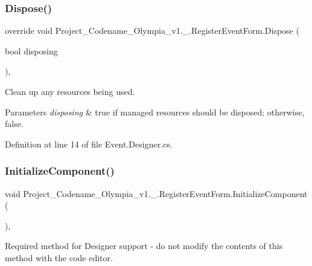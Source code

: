 \subsubsection{\texorpdfstring{Dispose()}{Dispose()}}
{\footnotesize\ttfamily override void Project\+\_\+\+Codename\+\_\+\+Olympia\+\_\+v1.\+\_.\+Register\+Event\+Form.\+Dispose (\begin{DoxyParamCaption}\item[{bool}]{disposing }\end{DoxyParamCaption})\hspace{0.3cm}{\ttfamily [inline]}, {\ttfamily [protected]}}



Clean up any resources being used. 


\begin{DoxyParams}{Parameters}
{\em disposing} & true if managed resources should be disposed; otherwise, false.\\
\hline
\end{DoxyParams}


Definition at line 14 of file Event.\+Designer.\+cs.

\mbox{\label{classProject__Codename__Olympia__v1_1_1__0_1_1RegisterEventForm_a729299b8fd07b2c179ed0ad3ea56c10e}} 
\subsubsection{\texorpdfstring{Initialize\+Component()}{InitializeComponent()}}
{\footnotesize\ttfamily void Project\+\_\+\+Codename\+\_\+\+Olympia\+\_\+v1.\+\_.\+Register\+Event\+Form.\+Initialize\+Component (\begin{DoxyParamCaption}{ }\end{DoxyParamCaption})\hspace{0.3cm}{\ttfamily [inline]}, {\ttfamily [private]}}



Required method for Designer support -\/ do not modify the contents of this method with the code editor. 




